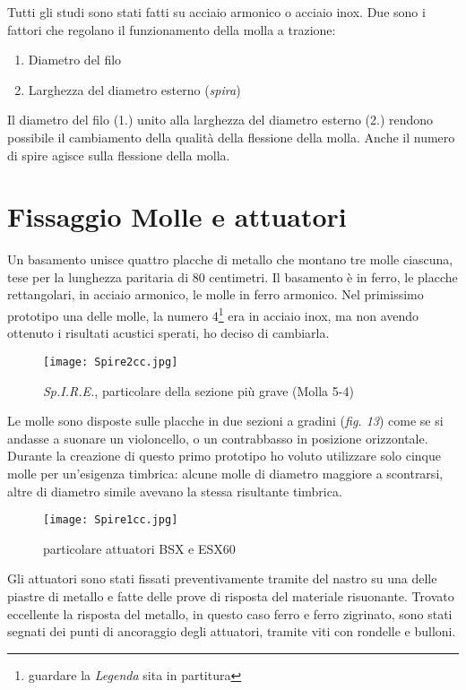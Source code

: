 Tutti gli studi sono stati fatti su acciaio armonico o acciaio inox. Due sono i fattori che regolano il funzionamento della molla a trazione:

\begin{enumerate}
\item{Diametro del filo}
\item{Larghezza del diametro esterno (\textit{spira})}
\end{enumerate}

Il diametro del filo (1.) unito alla larghezza del diametro esterno (2.) rendono possibile il cambiamento della qualità della flessione della molla. Anche il numero di spire agisce sulla flessione della molla.

\section{Fissaggio Molle e attuatori}

Un basamento unisce quattro placche di metallo che montano tre molle ciascuna, tese per la lunghezza paritaria di 80 centimetri. Il basamento è in ferro, le placche rettangolari, in acciaio armonico, le molle in ferro armonico. Nel primissimo prototipo una delle molle, la numero 4\footnote{guardare la \textit{Legenda} sita in partitura} era in acciaio inox, ma non avendo ottenuto i risultati acustici sperati, ho deciso di cambiarla. 
\begin{figure}[htbp]
\begin{center}
\texttt{[image: Spire2cc.jpg]}
\caption{\textit{Sp.I.R.E.}, particolare della sezione più grave (Molla 5-4)}
\label{default}
\end{center}
\end{figure}
Le molle sono disposte sulle placche in due sezioni a gradini (\textit{fig. 13}) come se si andasse a suonare un violoncello, o un contrabbasso in posizione orizzontale. Durante la creazione di questo primo prototipo ho voluto utilizzare solo cinque molle per un'esigenza timbrica: alcune molle di diametro maggiore a scontrarsi, altre di diametro simile avevano la stessa risultante timbrica. 
\begin{figure}[htbp]
\begin{center}
\texttt{[image: Spire1cc.jpg]}
\caption{particolare attuatori BSX e ESX60}
\label{default}
\end{center}
\end{figure}
Gli attuatori sono stati fissati preventivamente tramite del nastro su una delle piastre di metallo e fatte delle prove di risposta del materiale risuonante. Trovato eccellente la risposta del metallo, in questo caso ferro e ferro zigrinato, sono stati segnati dei punti di ancoraggio degli attuatori, tramite viti con rondelle e bulloni.



